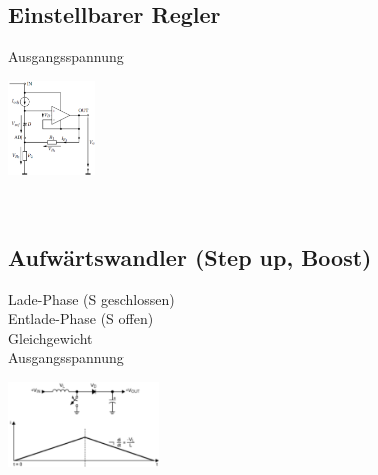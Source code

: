\subsection{Einstellbarer Regler}
  \begin{minipage}[T]{14cm}
    Ausgangsspannung
    \hspace{13mm}\\
  \end{minipage}
  \begin{minipage}{5cm}
    \includegraphics[height=2.5cm]{./bilder/ReglerEinstellbar.png}
  \end{minipage}\\
        
\subsection{Aufw\"artswandler (Step up, Boost)}
  \begin{minipage}[T]{14cm}
    Lade-Phase (S geschlossen)
    \hspace{0.5mm}\\  
    Entlade-Phase (S offen)
    \hspace{5.8mm}\\  
    Gleichgewicht
    \hspace{21mm}\\  
    Ausgangsspannung
    \hspace{13mm}\\
  \end{minipage}
  \begin{minipage}{5cm}
    \includegraphics[width=4cm]{./bilder/ReglerStepUpStromverlauf.png}
  \end{minipage}\\
        
